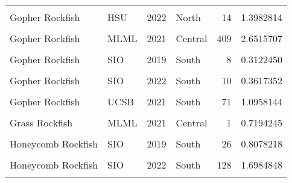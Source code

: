 \documentclass[
]{article}
\begin{document}
\begin{longtable}[t]{llrlrr}
\cellcolor{gray!6}{Gopher Rockfish} & \cellcolor{gray!6}{HSU} & \cellcolor{gray!6}{2021} & \cellcolor{gray!6}{North} & \cellcolor{gray!6}{18} & \cellcolor{gray!6}{1.9161123}\\
\addlinespace
Gopher Rockfish & HSU & 2022 & North & 14 & 1.3982814\\
\cellcolor{gray!6}{Gopher Rockfish} & \cellcolor{gray!6}{MLML} & \cellcolor{gray!6}{2019} & \cellcolor{gray!6}{Central} & \cellcolor{gray!6}{344} & \cellcolor{gray!6}{2.3199944}\\
Gopher Rockfish & MLML & 2021 & Central & 409 & 2.6515707\\
\cellcolor{gray!6}{Gopher Rockfish} & \cellcolor{gray!6}{MLML} & \cellcolor{gray!6}{2022} & \cellcolor{gray!6}{Central} & \cellcolor{gray!6}{653} & \cellcolor{gray!6}{3.4048567}\\
Gopher Rockfish & SIO & 2019 & South & 8 & 0.3122450\\
\addlinespace
\cellcolor{gray!6}{Gopher Rockfish} & \cellcolor{gray!6}{SIO} & \cellcolor{gray!6}{2021} & \cellcolor{gray!6}{South} & \cellcolor{gray!6}{3} & \cellcolor{gray!6}{0.6666667}\\
Gopher Rockfish & SIO & 2022 & South & 10 & 0.3617352\\
\cellcolor{gray!6}{Gopher Rockfish} & \cellcolor{gray!6}{UCSB} & \cellcolor{gray!6}{2019} & \cellcolor{gray!6}{South} & \cellcolor{gray!6}{20} & \cellcolor{gray!6}{0.5895150}\\
Gopher Rockfish & UCSB & 2021 & South & 71 & 1.0958144\\
\cellcolor{gray!6}{Gopher Rockfish} & \cellcolor{gray!6}{UCSB} & \cellcolor{gray!6}{2022} & \cellcolor{gray!6}{South} & \cellcolor{gray!6}{48} & \cellcolor{gray!6}{0.6268975}\\
\addlinespace
Grass Rockfish & MLML & 2021 & Central & 1 & 0.7194245\\
\cellcolor{gray!6}{Grass Rockfish} & \cellcolor{gray!6}{SIO} & \cellcolor{gray!6}{2019} & \cellcolor{gray!6}{South} & \cellcolor{gray!6}{2} & \cellcolor{gray!6}{0.2666667}\\
Honeycomb Rockfish & SIO & 2019 & South & 26 & 0.8078218\\
\cellcolor{gray!6}{Honeycomb Rockfish} & \cellcolor{gray!6}{SIO} & \cellcolor{gray!6}{2021} & \cellcolor{gray!6}{South} & \cellcolor{gray!6}{36} & \cellcolor{gray!6}{1.8248931}\\
Honeycomb Rockfish & SIO & 2022 & South & 128 & 1.6984848\\
\addlinespace
\cellcolor{gray!6}{Honeycomb Rockfish} & \cellcolor{gray!6}{UCSB} & \cellcolor{gray!6}{2021} & \cellcolor{gray!6}{South} & \cellcolor{gray!6}{4} & \cellcolor{gray!6}{0.3959790}\\

\end{longtable}
\end{document}
